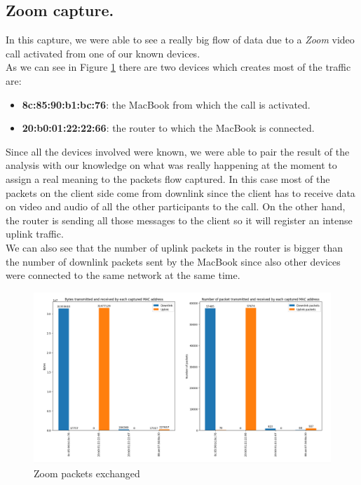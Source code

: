 \subsection{Zoom capture.}
In this capture, we were able to see a really big flow of data due to a \textit{Zoom} video call activated from 
one of our known devices.\\ 
As we can see in Figure \ref{fig:Zoom_packets} there are two devices which creates most of the traffic are:
\begin{itemize}
    \item \textbf{8c:85:90:b1:bc:76}: the MacBook from which the call is activated. 
    \item \textbf{20:b0:01:22:22:66}: the router to which the MacBook is connected. 
\end{itemize}
Since all the devices involved were known, we were able to pair the result of the analysis with our 
knowledge on what was really happening at the moment to assign a real meaning to the packets flow 
captured. In this case most of the packets on the client side come from downlink since the client 
has to receive data on video and audio of all the other participants to the call. On the other hand,
the router is sending all those messages to the client so it will register an intense uplink traffic.\\
We can also see that the number of uplink packets in the router is bigger than the number of downlink
packets sent by the MacBook since also other devices were connected to the same network at the same
time. 
\begin{figure}[h]
    \includegraphics[width=\textwidth]{Graphs/Zoom_bytes_packets.png}
    \caption{Zoom packets exchanged}
    \label{fig:Zoom_packets}
\end{figure}


